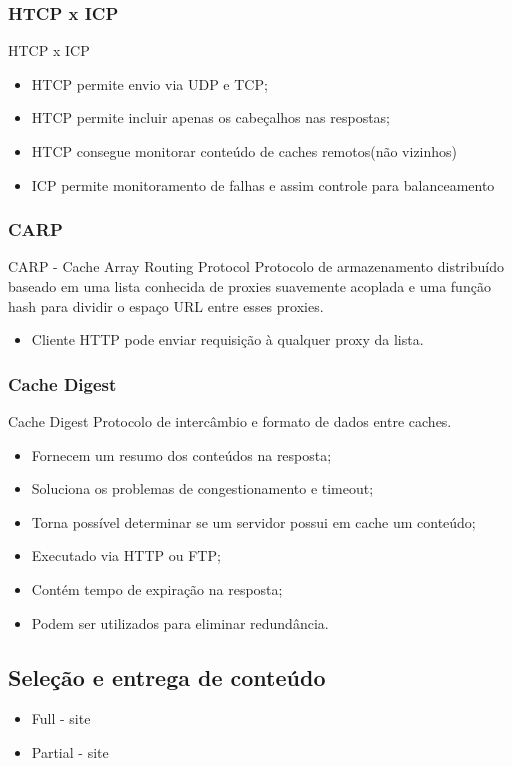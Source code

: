 \subsubsection{HTCP x ICP}
HTCP x ICP
\begin{itemize}
\item HTCP permite envio via UDP e TCP;
\item HTCP permite incluir apenas os cabeçalhos nas respostas;
\item HTCP consegue monitorar conte\'udo de caches remotos(n\~ao vizinhos)
\item ICP permite monitoramento de falhas e assim controle para balanceamento
\end{itemize}

\subsubsection{CARP}
CARP -  Cache Array Routing Protocol
Protocolo de armazenamento distribu\'ido baseado em uma lista conhecida de proxies suavemente acoplada e uma fun\c{c}\~ao hash para dividir o espa\c{c}o URL entre esses proxies.
\begin{itemize}
\item Cliente HTTP pode enviar requisi\c{c}\~ao \`a qualquer proxy da lista.
\end{itemize}

\subsubsection{Cache Digest}
Cache Digest
Protocolo de interc\^ambio e formato de dados entre caches.
\begin{itemize}
\item Fornecem um resumo dos conte\'udos na resposta;
\item Soluciona os problemas de congestionamento e timeout;
\item Torna poss\'ivel determinar se um servidor possui em cache um conte\'udo;
\item Executado via HTTP ou FTP;
\item Cont\'em tempo de expira\c{c}\~ao na resposta;
\item Podem ser utilizados para eliminar redund\^ancia.
\end{itemize}

\subsection{Sele\c{c}\~ao e entrega de conte\'udo}
\begin{itemize}
	\item Full - site
	\item Partial - site
\end{itemize}

